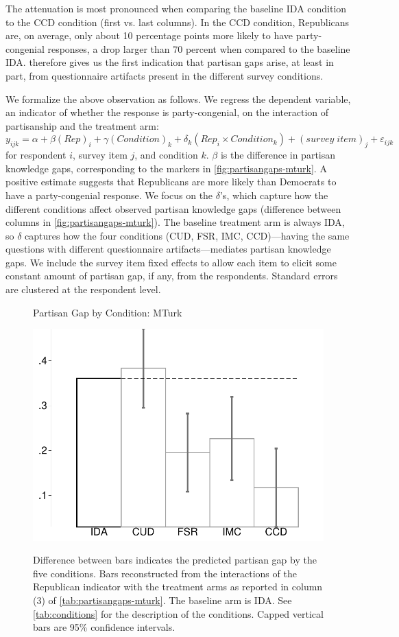 \documentclass[12pt, letterpaper]{article}
\begin{document}
The attenuation is most pronounced when comparing the baseline IDA condition to the CCD condition (first vs. last columns). In the CCD condition, Republicans are, on average, only about 10 percentage points more likely to have party-congenial responses, a drop larger than 70 percent when compared to the baseline IDA.  therefore gives us the first indication that partisan gaps arise, at least in part, from questionnaire artifacts present in the different survey conditions.

We formalize the above observation as follows. We regress the dependent variable, an indicator of whether the response is party-congenial, on the interaction of partisanship and the treatment arm:
\begin{equation}\label{eq:partisangap-mturk}
y_{ijk} = \alpha + \beta (Rep)_i + \gamma (Condition)_k + \delta_k (Rep_i \times Condition_k) + (survey \; item)_j + \varepsilon_{ijk}
\end{equation}
for respondent $i$, survey item $j$, and condition $k$. $\beta$ is the difference in partisan knowledge gaps, corresponding to the markers in \cref{fig:partisangaps-mturk}. A positive estimate suggests that Republicans are more likely than Democrats to have a party-congenial response. We focus on the $\delta$'s, which capture how the different conditions affect observed partisan knowledge gaps (difference between columns in \cref{fig:partisangaps-mturk}). The baseline treatment arm is always IDA, so $\delta$ captures how the four conditions (CUD, FSR, IMC, CCD)---having the same questions with different questionnaire artifacts---mediates partisan knowledge gaps.
We include the survey item fixed effects to allow each item to elicit some constant amount of partisan gap, if any, from the respondents. Standard errors are clustered at the respondent level.

\begin{figure}[t]
	\centering
	\caption{Partisan Gap by Condition: MTurk}
	\includegraphics[width=.55\textwidth]{../figs/mturk-pgag-surveyarms.pdf}
	\label{fig:partisangaps-mturk-reg}
	\caption*{\footnotesize 
		Difference between bars indicates the predicted partisan gap by the five conditions. 
		Bars reconstructed from the interactions of the Republican indicator with the treatment arms as reported in column (3) of \cref{tab:partisangaps-mturk}.
		The baseline arm is IDA.
		See \cref{tab:conditions} for the description of the conditions.
		Capped vertical bars are 95\% confidence intervals.
	}
\end{figure}
\end{document}
